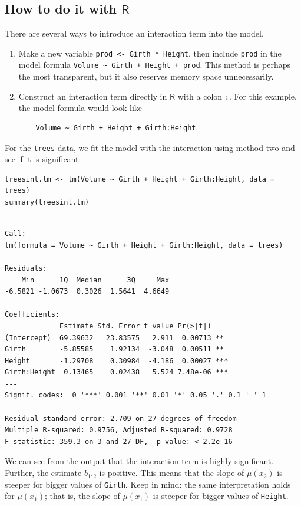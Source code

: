 \documentclass[captions=tableheading]{scrbook}
\begin{document}
\subsection{How to do it with \(\mathsf{R}\)}
\label{sec-12-5-2}


There are several ways to introduce an interaction term into the model.
\begin{enumerate}
\item Make a new variable \texttt{prod <- Girth * Height}, then include \texttt{prod} in the model formula \texttt{Volume \textasciitilde{} Girth + Height + prod}. This method is perhaps the most transparent, but it also reserves memory space unnecessarily.
\item Construct an interaction term directly in \(\mathsf{R}\) with a colon \texttt{:}. For this example, the model formula would look like 
\begin{verbatim}
    Volume ~ Girth + Height + Girth:Height
\end{verbatim}
\end{enumerate}

For the \texttt{trees} data, we fit the model with the interaction using method two and see if it is significant:


\lstset{language=R}
\begin{lstlisting}
treesint.lm <- lm(Volume ~ Girth + Height + Girth:Height, data = trees)
summary(treesint.lm)
\end{lstlisting}


\begin{verbatim}

Call:
lm(formula = Volume ~ Girth + Height + Girth:Height, data = trees)

Residuals:
    Min      1Q  Median      3Q     Max 
-6.5821 -1.0673  0.3026  1.5641  4.6649 

Coefficients:
             Estimate Std. Error t value Pr(>|t|)    
(Intercept)  69.39632   23.83575   2.911  0.00713 ** 
Girth        -5.85585    1.92134  -3.048  0.00511 ** 
Height       -1.29708    0.30984  -4.186  0.00027 ***
Girth:Height  0.13465    0.02438   5.524 7.48e-06 ***
---
Signif. codes:  0 '***' 0.001 '**' 0.01 '*' 0.05 '.' 0.1 ' ' 1 

Residual standard error: 2.709 on 27 degrees of freedom
Multiple R-squared: 0.9756,	Adjusted R-squared: 0.9728 
F-statistic: 359.3 on 3 and 27 DF,  p-value: < 2.2e-16
\end{verbatim}

We can see from the output that the interaction term is highly significant. Further, the estimate \(b_{1:2}\) is positive. This means that the slope of \(\mu(x_{2})\) is steeper for bigger values of \texttt{Girth}. Keep in mind: the same interpretation holds for \(\mu(x_{1})\); that is, the slope of \(\mu(x_{1})\) is steeper for bigger values of \texttt{Height}.
\end{document}
